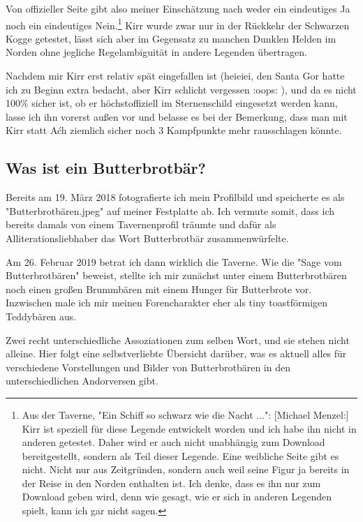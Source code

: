 \documentclass[10pt, a4paper, oneside]{book}
\begin{document}
{Von offizieller Seite gibt also meiner Einschätzung nach weder ein eindeutiges Ja noch ein eindeutiges Nein.\footnote{Aus der Taverne, "Ein Schiff so schwarz wie die Nacht ...": [Michael Menzel:] Kirr ist speziell für diese Legende entwickelt worden und ich habe ihn nicht in anderen getestet. Daher wird er auch nicht unabhängig zum Download bereitgestellt, sondern als Teil dieser Legende. Eine weibliche Seite gibt es nicht. Nicht nur aus Zeitgründen, sondern auch weil seine Figur ja bereits in der Reise in den Norden enthalten ist. Ich denke, dass es ihn nur zum Download geben wird, denn wie gesagt, wie er sich in anderen Legenden spielt, kann ich gar nicht sagen.} Kirr wurde zwar nur in der Rückkehr der Schwarzen Kogge getestet, lässt sich aber im Gegensatz zu manchen Dunklen Helden im Norden ohne jegliche Regelambiguität in andere Legenden übertragen.



Nachdem mir Kirr erst relativ spät eingefallen ist (heieiei, den Santa Gor hatte ich zu Beginn extra bedacht, aber Kirr schlicht vergessen :oops: ), und da es nicht 100\% sicher ist, ob er höchstoffiziell im Sternenschild eingesetzt werden kann, lasse ich ihn vorerst außen vor und belasse es bei der Bemerkung, dass man mit Kirr statt Aćh ziemlich sicher noch 3 Kampfpunkte mehr rausschlagen könnte.

}







\begin{chapterbox}
    \chapter{Was ist ein Butterbrotbär?}
    \label{Was ist ein Butterbrotbär?}
    Bereits am 19. März 2018 fotografierte ich mein Profilbild und speicherte es als "Butterbrotbären.jpeg" auf meiner Festplatte ab. Ich vermute somit, dass ich bereits damals von einem Tavernenprofil träumte und dafür als Alliterationsliebhaber das Wort Butterbrotbär zusammenwürfelte.
    
    Am 26. Februar 2019 betrat ich dann wirklich die Taverne. Wie die "Sage vom Butterbrotbären" beweist, stellte ich mir zunächst unter einem Butterbrotbären noch einen großen Brummbären mit einem Hunger für Butterbrote vor. Inzwischen male ich mir meinen Forencharakter eher als tiny toastförmigen Teddybären aus. 
    
    Zwei recht unterschiedliche Assoziationen zum selben Wort, und sie stehen nicht alleine. Hier folgt eine selbstverliebte Übersicht darüber, was es aktuell alles für verschiedene Vorstellungen und Bilder von Butterbrotbären in den unterschiedlichen Andorversen gibt.
\end{chapterbox}
\end{document}
